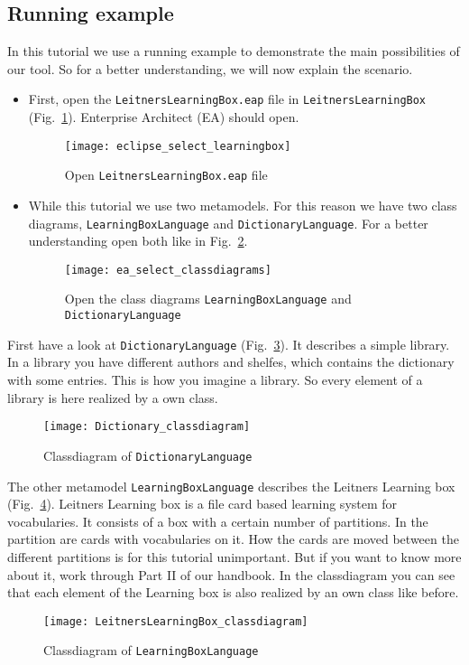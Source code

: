\subsection{Running example}
In this tutorial we use a running example to demonstrate the main possibilities of our tool. So for a better understanding, we will now explain the scenario.
\begin{itemize}
\item First, open the \texttt{Leitners\-Learning\-Box.eap} file in \texttt{Leitners\-Learning\-Box} (Fig.~\ref{eclipse_open_eap}). Enterprise Architect (EA) should open.

\begin{figure}[htbp]
	\centering
  \texttt{[image: eclipse\_select\_learningbox]}
	\caption{Open \texttt{Leitners\-Learning\-Box.eap} file} 
	\label{eclipse_open_eap} 
\end{figure}

\item While this tutorial we use two metamodels. For this reason we have two class diagrams, \texttt{LearningBoxLanguage} and \texttt{DictionaryLanguage}. For a better understanding open both like in Fig.~\ref{ea_select_classdiagrams}.

  \begin{figure}[htbp]
	\centering
  \texttt{[image: ea\_select\_classdiagrams]}
	\caption{Open the class diagrams \texttt{Learning\-Box\-Language} and \texttt{Dictionary\-Language}} 
	\label{ea_select_classdiagrams} 
\end{figure}

\end{itemize}

First have a look at \texttt{DictionaryLanguage} (Fig.~\ref{ea:classdiagram_DictionaryLanguage}). It  describes a simple library. In a library you have different authors and shelfes, which contains the dictionary with some entries. This is how you imagine a library. So every element of a library is here realized by a own class. 

\begin{figure}[htbp]
	\centering
  \texttt{[image: Dictionary\_classdiagram]}
	\caption{Classdiagram of \texttt{Dictionary\-Language}} 
	\label{ea:classdiagram_DictionaryLanguage} 
\end{figure}

The other metamodel \texttt{Learning\-Box\-Language} describes the Leitners Learning box (Fig.~\ref{ea:classdiagram_LearningBoxLanguage}). Leitners Learning box is a file card based learning system for vocabularies. It consists of a box with a certain number of partitions. In the partition are cards with vocabularies on it. How the cards are moved between the different partitions is for this tutorial unimportant. But if you want to know more about it, work through Part II of our handbook.
\newline
In the classdiagram you can see that each element of the Learning box is also realized by an own class like before.

\begin{figure}[htbp]
	\centering
  \texttt{[image: LeitnersLearningBox\_classdiagram]}
	\caption{Classdiagram of \texttt{Learning\-Box\-Language}} 
	\label{ea:classdiagram_LearningBoxLanguage} 
\end{figure}